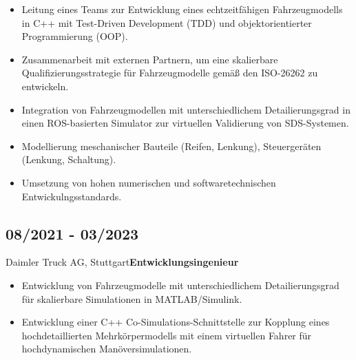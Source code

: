 \documentclass{classic}
\begin{document}
\begin{paracol}{2}
{\begin{itemize}
            \item Leitung eines Teams zur Entwicklung eines echtzeitf\"ahigen
                Fahrzeugmodells in C++ mit Test-Driven Development (TDD) und
                objektorientierter Programmierung (OOP).

            \item Zusammenarbeit mit externen Partnern, um eine skalierbare
                Qualifizierungsstrategie für Fahrzeugmodelle gem{\"a}{\ss} den
                ISO-26262 zu entwickeln.

            \item Integration von Fahrzeugmodellen mit unterschiedlichem
                Detailierungsgrad in einen ROS-basierten Simulator zur
                virtuellen Validierung von SDS-Systemen.
            
            \item Modellierung meschanischer Bauteile (Reifen, Lenkung),
                Steuerger{\"a}ten (Lenkung, Schaltung).

            \item Umsetzung von hohen numerischen und softwaretechnischen
                Entwickulngsstandards. 


          \end{itemize}
     
          \subsection{08/2021 - 03/2023}{Daimler Truck AG, Stuttgart}{{\bfseries Entwicklungsingenieur}}
           \begin{itemize}
               \item Entwicklung von Fahrzeugmodelle mit unterschiedlichem
                   Detailierungsgrad f{\"u}r skalierbare Simulationen in MATLAB/Simulink.

               \item Entwicklung einer C++ Co-Simulations-Schnittstelle zur
                   Kopplung eines hochdetaillierten Mehrk{\"o}rpermodells mit
                   einem virtuellen Fahrer für hochdynamischen
                   Man{\"o}versimulationen.
           \end{itemize}

}
\end{paracol}
\end{document}
